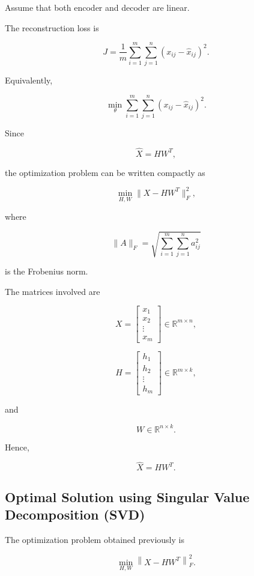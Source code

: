 \documentclass{article}
\begin{document}
Assume that both encoder and decoder are linear.

The reconstruction loss is

\[
\boxed{
	J
	=
	\frac1m
	\sum_{i=1}^{m}
	\sum_{j=1}^{n}
	\left(
	x_{ij}
	-
	\hat{x}_{ij}
	\right)^2.
}
\]

Equivalently,

\[
\boxed{
	\min_{\theta}
	\sum_{i=1}^{m}
	\sum_{j=1}^{n}
	(x_{ij}-\hat{x}_{ij})^2.
}
\]

Since

\[
\hat{X}=HW^{T},
\]

the optimization problem can be written compactly as

\[
\boxed{
	\min_{H,W}
	\|
	X-HW^{T}
	\|_{F}^{2},
}
\]

where

\[
\|A\|_{F}
=
\sqrt{
	\sum_{i=1}^{m}
	\sum_{j=1}^{n}
	a_{ij}^{2}
}
\]

is the Frobenius norm.

The matrices involved are

\[
X
=
\begin{bmatrix}
	x_1\\
	x_2\\
	\vdots\\
	x_m
\end{bmatrix}
\in\mathbb{R}^{m\times n},
\]

\[
H
=
\begin{bmatrix}
	h_1\\
	h_2\\
	\vdots\\
	h_m
\end{bmatrix}
\in\mathbb{R}^{m\times k},
\]

and

\[
W
\in
\mathbb{R}^{n\times k}.
\]

Hence,

\[
\boxed{
	\hat{X}=HW^{T}.
}
\]

\subsection{Optimal Solution using Singular Value Decomposition (SVD)}

The optimization problem obtained previously is

\[
\boxed{
	\min_{H,W}
	\left\|
	X-HW^{T}
	\right\|_{F}^{2}.
}
\tag{1}
\]
\end{document}
